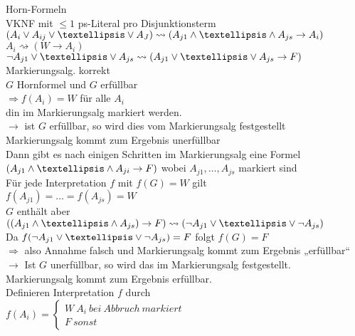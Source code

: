 

Horn-Formeln\\
VKNF mit $\leq 1$ ps-Literal pro Disjunktionsterm\\

$(A_i \OR A_{ij} \OR … \OR A_J) \rightsquigarrow (A_{j1} \AND … \AND A_{js} \rightarrow  A_i)$\\
$A_i \rightsquigarrow (W \rightarrow A_i)$\\
$\neg A_{j1} \OR … \OR A_{js} \rightsquigarrow (A_{j1} \OR … \OR A_{js} \rightarrow F)$\\

\satz{} Markierungsalg. korrekt\\

\beweis{}
$G$ Hornformel und $G$ erfüllbar\\
$\Rightarrow f(A_i) = W$ für alle $A_i$\\
din im Markierungsalg markiert werden.\\

$\rightarrow$ ist $G$ erfüllbar, so wird dies vom Markierungsalg festgestellt\\

\annahme{}
Markierungsalg kommt zum Ergebnis unerfüllbar\\
Dann gibt es nach einigen Schritten im Markierungsalg eine Formel $(A_{j1} \AND … \AND A_{ji} \rightarrow F)$ wobei $A_{j1}, …, A_{js}$ markiert sind\\

\behauptung{}
Für jede Interpretation $f$ mit $f(G) = W$ gilt\\
$f(A_{j1}) = … = f(A_{js}) = W$\\
$G$ enthält aber $((A_{j1} \AND … \AND A_{js}) \rightarrow F) \rightsquigarrow ( \neg A_{j1} \OR … \OR \neg A_{js})$\\
Da $f(\neg A_{j1} \OR … \OR \neg A_{js}) =F$ folgt $f(G)=F$\\
$\Rightarrow$ also Annahme falsch und Markierungsalg kommt zum Ergebnis „erfüllbar“\\

$\rightarrow$ Ist $G$ unerfüllbar, so wird das im Markierungsalg festgestellt.\\

\annahme{}
Markierungsalg kommt zum Ergebnis erfüllbar.\\
Definieren Interpretation $f$ durch\\
$f(A_i) = \begin{cases} W\ A_i\ bei\ Abbruch\ markiert \\ F\ sonst \end{cases}$\\

